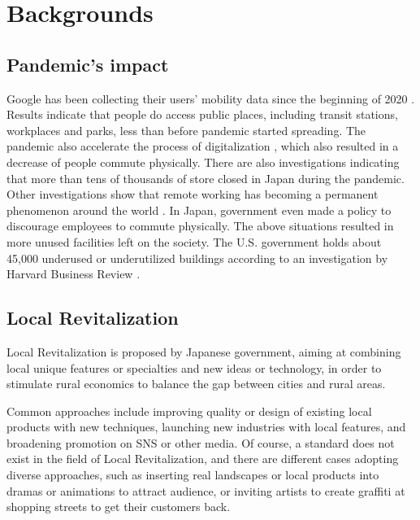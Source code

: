 \chapter{Backgrounds} \label{ch:2}

\section{Pandemic's impact}

Google has been collecting their users' mobility data since the beginning of 2020 \cite{googlemobilityreports} \cite{ourworldindata_2020}.
Results indicate that people do access public places, including transit stations, workplaces and parks, less than before pandemic started spreading.
The pandemic also accelerate the process of digitalization \cite{amankwah-amoah_khan_wood_knight_2021}, which also resulted in a decrease of people commute physically.
There are also investigations indicating that more than tens of thousands of store closed in Japan during the pandemic.
Other investigations show that remote working has becoming a permanent phenomenon around the world \cite{saad_wigert_2021}.
In Japan, government even made a policy to discourage employees to commute physically.
The above situations resulted in more unused facilities left on the society.
The U.S. government holds about 45,000 underused or underutilized buildings according to an investigation by Harvard Business Review \cite{hounsell_2020}.

\section{Local Revitalization}
Local Revitalization is proposed by Japanese government, aiming at combining local unique features or specialties and new ideas or technology,
in order to stimulate rural economics to balance the gap between cities and rural areas.

Common approaches include improving quality or design of existing local products with new techniques, launching new industries with local features, and broadening promotion on SNS or other media.
Of course, a standard does not exist in the field of Local Revitalization, and there are different cases adopting diverse approaches,
such as inserting real landscapes or local products into dramas or animations to attract audience,
or inviting artists to create graffiti at shopping streets to get their customers back.

